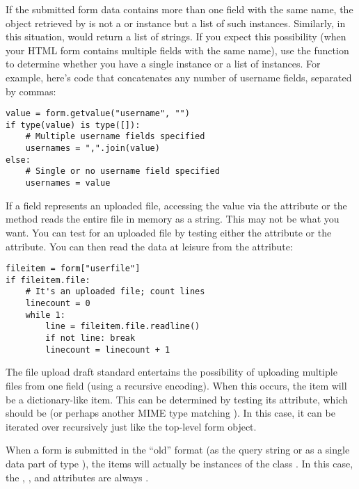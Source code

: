 If the submitted form data contains more than one field with the same
name, the object retrieved by  is not a
 or 
instance but a list of such instances.  Similarly, in this situation,
 would return a list of strings.
If you expect this possibility
(when your HTML form contains multiple fields with the same
name), use the  function to determine whether you
have a single instance or a list of instances.  For example, here's
code that concatenates any number of username fields, separated by
commas:

\begin{verbatim}
value = form.getvalue("username", "")
if type(value) is type([]):
    # Multiple username fields specified
    usernames = ",".join(value)
else:
    # Single or no username field specified
    usernames = value
\end{verbatim}

If a field represents an uploaded file, accessing the value via the
 attribute or the  method reads the
entire file in memory as a string.  This may not be what you want.
You can test for an uploaded file by testing either the 
attribute or the  attribute.  You can then read the data at
leisure from the  attribute:

\begin{verbatim}
fileitem = form["userfile"]
if fileitem.file:
    # It's an uploaded file; count lines
    linecount = 0
    while 1:
        line = fileitem.file.readline()
        if not line: break
        linecount = linecount + 1
\end{verbatim}

The file upload draft standard entertains the possibility of uploading
multiple files from one field (using a recursive
 encoding).  When this occurs, the item will be
a dictionary-like  item.  This can be determined
by testing its  attribute, which should be
 (or perhaps another MIME type matching
).  In this case, it can be iterated over
recursively just like the top-level form object.

When a form is submitted in the ``old'' format (as the query string or
as a single data part of type
), the items will actually
be instances of the class .  In this case, the
, , and  attributes are
always .


